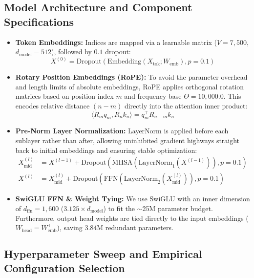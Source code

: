 \documentclass[8pt]{article}
\begin{document}
\subsection{Model Architecture and Component Specifications}
\label{subsec:architecture}

\begin{itemize}
    \item \textbf{Token Embeddings:} Indices are mapped via a learnable matrix ($V = 7,500$, $d_{\text{model}} = 512$), followed by $0.1$ dropout:
    \begin{equation}
        X^{(0)} = \text{Dropout}\left(\text{Embedding}(X_{\text{tok}}; W_{\text{emb}}), p = 0.1\right)
    \end{equation}
    \item \textbf{Rotary Position Embeddings (RoPE):} To avoid the parameter overhead and length limits of absolute embeddings, RoPE applies orthogonal rotation matrices based on position index $m$ and frequency base $\Theta = 10,000.0$. This encodes relative distance $(n - m)$ directly into the attention inner product:
    \begin{equation}
        \langle R_m q_m, R_n k_n \rangle = q_m^\top R_{n - m} k_n
    \end{equation}
    \item \textbf{Pre-Norm Layer Normalization:} LayerNorm is applied before each sublayer rather than after, allowing uninhibited gradient highways straight back to initial embeddings and ensuring stable optimization:
    \begin{align}
        X^{(l)}_{\text{mid}} &= X^{(l-1)} + \text{Dropout}\left(\text{MHSA}\left(\text{LayerNorm}_1(X^{(l-1)})\right), p = 0.1\right) \\
        X^{(l)} &= X^{(l)}_{\text{mid}} + \text{Dropout}\left(\text{FFN}\left(\text{LayerNorm}_2(X^{(l)}_{\text{mid}})\right), p = 0.1\right)
    \end{align}
    \item \textbf{SwiGLU FFN \& Weight Tying:} We use SwiGLU with an inner dimension of $d_{\text{ffn}} = 1,600$ ($3.125 \times d_{\text{model}}$) to fit the $\sim$25M parameter budget. Furthermore, output head weights are tied directly to the input embeddings ($W_{\text{head}} = W_{\text{emb}}^\top$), saving $3.84\text{M}$ redundant parameters.
\end{itemize}

\subsection{Hyperparameter Sweep and Empirical Configuration Selection}
\label{subsec:sweep}
\end{document}
